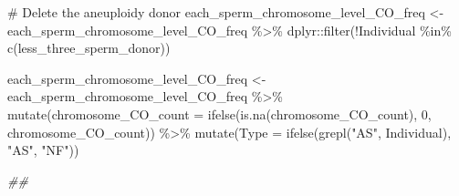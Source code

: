 \documentclass[
  letterpaper,
  DIV=11,
  numbers=noendperiod]{scrreprt}
\newenvironment{Shaded}{\begin{snugshade}}{\end{snugshade}}
\newcommand{\AttributeTok}[1]{\textcolor[rgb]{0.40,0.45,0.13}{#1}}
\newcommand{\CommentTok}[1]{\textcolor[rgb]{0.37,0.37,0.37}{#1}}
\newcommand{\DecValTok}[1]{\textcolor[rgb]{0.68,0.00,0.00}{#1}}
\newcommand{\DocumentationTok}[1]{\textcolor[rgb]{0.37,0.37,0.37}{\textit{#1}}}
\newcommand{\FunctionTok}[1]{\textcolor[rgb]{0.28,0.35,0.67}{#1}}
\newcommand{\NormalTok}[1]{\textcolor[rgb]{0.00,0.23,0.31}{#1}}
\newcommand{\OtherTok}[1]{\textcolor[rgb]{0.00,0.23,0.31}{#1}}
\newcommand{\SpecialCharTok}[1]{\textcolor[rgb]{0.37,0.37,0.37}{#1}}
\newcommand{\StringTok}[1]{\textcolor[rgb]{0.13,0.47,0.30}{#1}}
\begin{document}
\begin{codelisting}
\begin{Shaded}
\begin{Highlighting}[]
\CommentTok{\# Delete the aneuploidy donor}
\NormalTok{each\_sperm\_chromosome\_level\_CO\_freq }\OtherTok{\textless{}{-}}\NormalTok{ each\_sperm\_chromosome\_level\_CO\_freq }\SpecialCharTok{\%\textgreater{}\%}\NormalTok{ dplyr}\SpecialCharTok{::}\FunctionTok{filter}\NormalTok{(}\SpecialCharTok{!}\NormalTok{Individual }\SpecialCharTok{\%in\%} \FunctionTok{c}\NormalTok{(less\_three\_sperm\_donor))}


\NormalTok{each\_sperm\_chromosome\_level\_CO\_freq }\OtherTok{\textless{}{-}}\NormalTok{ each\_sperm\_chromosome\_level\_CO\_freq }\SpecialCharTok{\%\textgreater{}\%} \FunctionTok{mutate}\NormalTok{(}\AttributeTok{chromosome\_CO\_count =} \FunctionTok{ifelse}\NormalTok{(}\FunctionTok{is.na}\NormalTok{(chromosome\_CO\_count), }\DecValTok{0}\NormalTok{, chromosome\_CO\_count)) }\SpecialCharTok{\%\textgreater{}\%} 
  \FunctionTok{mutate}\NormalTok{(}\AttributeTok{Type =} \FunctionTok{ifelse}\NormalTok{(}\FunctionTok{grepl}\NormalTok{(}\StringTok{"AS"}\NormalTok{, Individual), }\StringTok{"AS"}\NormalTok{, }\StringTok{"NF"}\NormalTok{))}


\DocumentationTok{\#\#}
\end{Highlighting}
\end{Shaded}

\end{codelisting}
\end{document}
